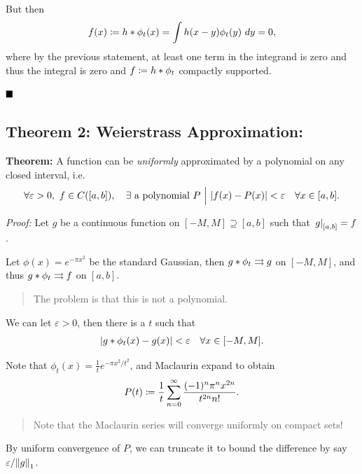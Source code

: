 But then
\begin{align*}
f(x) \coloneqq h \ast \phi_t(x) = \int h(x-y)\phi_t(y)~dy = 0
,\end{align*} where by the previous statement, at least one term in the
integrand is zero and thus the integral is zero and
\(f \coloneqq h \ast \phi_t\) compactly supported.

\(\qed\)

\hypertarget{theorem-2-weierstrass-approximation}{%
\subsection{Theorem 2: Weierstrass
Approximation:}\label{theorem-2-weierstrass-approximation}}

\textbf{Theorem:} A function can be \emph{uniformly} approximated by a
polynomial on any closed interval, i.e.
\begin{align*}
\forall\varepsilon > 0,~ f\in C([a, b]),\quad \exists \text{ a polynomial } P {~\mathrel{\Big|}~} {\left\lvert {f(x) - P(x)} \right\rvert} < \varepsilon \quad \forall x\in [a, b].
\end{align*}

\emph{Proof:} Let \(g\) be a continuous function on
\([-M, M] \supseteq [a, b]\) such that
\({\left.{g}\right|_{[a, b]}} = f\).

Let \(\phi(x) = e^{-\pi x^2}\) be the standard Gaussian, then
\(g \ast \phi_t \rightrightarrows g\) on \([-M, M ]\), and thus
\(g\ast \phi_t \rightrightarrows f\) on \([a, b]\).

\begin{quote}
The problem is that this is not a polynomial.
\end{quote}

We can let \(\varepsilon > 0\), then there is a \(t\) such that
\begin{align*}
{\left\lvert {g\ast \phi_t(x) - g(x)} \right\rvert} < \varepsilon \quad \forall x\in[-M, M]
.\end{align*}

Note that \(\phi_t(x) = \frac 1 t e^{-\pi x^2 / t^2}\), and Maclaurin
expand to obtain
\begin{align*}
P(t) \coloneqq \frac 1 t \sum_{n=0}^\infty \frac{(-1)^n \pi^n x^{2n}}{t^{2n} n!}
.\end{align*}

\begin{quote}
Note that the Maclaurin series will converge uniformly on compact sets!
\end{quote}

By uniform convergence of \(P\), we can truncate it to bound the
difference by say \(\varepsilon / {\left\lVert {g} \right\rVert}_1\).

